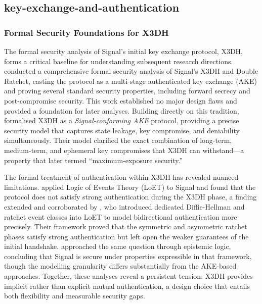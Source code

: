 \subsection{key-exchange-and-authentication}

\subsubsection{Formal Security Foundations for X3DH}

The formal security analysis of Signal's initial key exchange protocol, X3DH, forms a critical baseline for understanding subsequent research directions. \textcite{cohn-gordon2020} conducted a comprehensive formal security analysis of Signal's X3DH and Double Ratchet, casting the protocol as a multi-stage authenticated key exchange (AKE) and proving several standard security properties, including forward secrecy and post-compromise security. This work established no major design flaws and provided a foundation for later analyses. Building directly on this tradition, \textcite{hashimoto2021,hashimoto2022} formalised X3DH as a \emph{Signal-conforming AKE} protocol, providing a precise security model that captures state leakage, key compromise, and deniability simultaneously. Their model clarified the exact combination of long-term, medium-term, and ephemeral key compromises that X3DH can withstand—a property that \textcite{fiedler2025} later termed ``maximum-exposure security.''

The formal treatment of authentication within X3DH has revealed nuanced limitations. \textcite{li2024} applied Logic of Events Theory (LoET) to Signal and found that the protocol does not satisfy strong authentication during the X3DH phase, a finding extended and corroborated by \textcite{xiao2025}, who introduced dedicated Diffie-Hellman and ratchet event classes into LoET to model bidirectional authentication more precisely. Their framework proved that the symmetric and asymmetric ratchet phases satisfy strong authentication but left open the weaker guarantees of the initial handshake. \textcite{kamkuemah2021} approached the same question through epistemic logic, concluding that Signal is secure under properties expressible in that framework, though the modelling granularity differs substantially from the AKE-based approaches. Together, these analyses reveal a persistent tension: X3DH provides implicit rather than explicit mutual authentication, a design choice that entails both flexibility and measurable security gaps.

